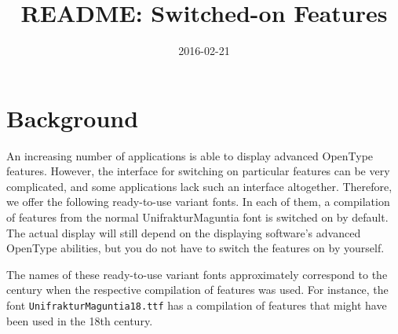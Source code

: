 \documentclass{scrartcl}
\begin{document}
\title{README: Switched-on Features}
\date{2016-02-21}
\maketitle
\section{Background}
An increasing number of applications is able to display advanced OpenType features. However, the interface for switching on particular features can be very complicated, and some applications lack such an interface altogether. Therefore, we offer the following ready-to-use variant fonts. In each of them, a compilation of features from the normal UnifrakturMaguntia font is switched on by default. The actual display will still depend on the displaying software’s advanced OpenType abilities, but you do not have to switch the features on by yourself.

The names of these ready-to-use variant fonts approximately correspond to the century when the respective compilation of features was used. For instance, the font \texttt{UnifrakturMaguntia18.ttf} has a compilation of features that might have been used in the 18th century.
\end{document}
